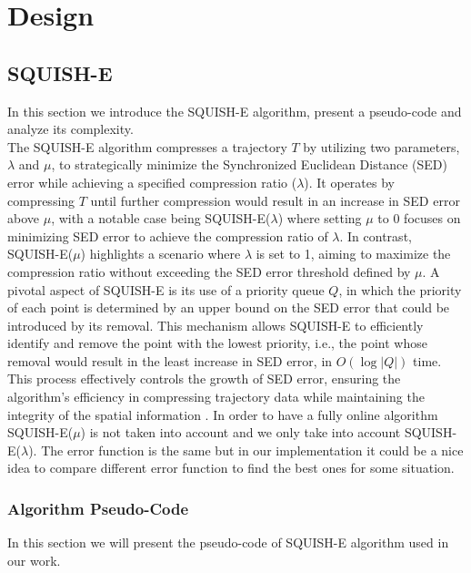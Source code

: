 
\chapter{Design}
\section{SQUISH-E}
In this section we introduce the SQUISH-E algorithm, present a pseudo-code and analyze its complexity. \\

The SQUISH-E algorithm compresses a trajectory \(T\) by utilizing two parameters, \(\lambda\) and \(\mu\), to strategically minimize the Synchronized Euclidean Distance (SED) error while achieving a specified compression ratio (\(\lambda\)). It operates by compressing \(T\) until further compression would result in an increase in SED error above \(\mu\), with a notable case being SQUISH-E(\(\lambda\)) where setting \(\mu\) to 0 focuses on minimizing SED error to achieve the compression ratio of \(\lambda\). In contrast, SQUISH-E(\(\mu\)) highlights a scenario where \(\lambda\) is set to 1, aiming to maximize the compression ratio without exceeding the SED error threshold defined by \(\mu\). A pivotal aspect of SQUISH-E is its use of a priority queue \(Q\), in which the priority of each point is determined by an upper bound on the SED error that could be introduced by its removal. This mechanism allows SQUISH-E to efficiently identify and remove the point with the lowest priority, i.e., the point whose removal would result in the least increase in SED error, in \(O(\log |Q|)\) time. This process effectively controls the growth of SED error, ensuring the algorithm's efficiency in compressing trajectory data while maintaining the integrity of the spatial information \cite{muckell2014compression}. In order to have a fully online algorithm SQUISH-E(\(\mu\)) is not taken into account and we only take into account SQUISH-E(\(\lambda\)). The error function is the same but in our implementation it could be a nice idea to compare different error function to find the best ones for some situation.

\subsection{Algorithm Pseudo-Code}
In this section we will present the pseudo-code of SQUISH-E algorithm used in our work. \\

